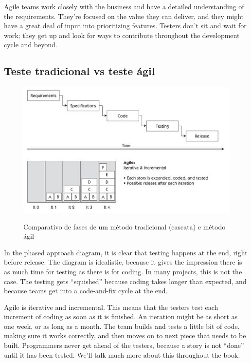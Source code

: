 \documentclass[
	12pt,				%
	openright,			%
	oneside,			%
	a4paper,			%
	english,			%
	brazil,				%
	]{abntex2}
\begin{document}
Agile teams work closely with the business and have a detailed understanding of the requirements. They’re focused on the value they can deliver, and they might have a great deal of input into prioritizing features. Testers don’t sit and wait for work; they get up and look for ways to contribute throughout the development cycle and beyond.

\subsection{Teste tradicional vs teste ágil}

\begin{figure}[H]
    \centering
    \caption{Comparativo de fases de um método tradicional (cascata) e método ágil}
    \graphicspath{ {./graphics/agile/} }
    \includegraphics[scale=1.0]{waterfall-vs-agile}
    \label{fig:waterfall-vs-agile}
\end{figure}

In the phased approach diagram, it is clear that testing happens at the end, right before release. The diagram is idealistic, because it gives the impression there is as much time for testing as there is for coding. In many projects, this is not the case. The testing gets “squished” because coding takes longer than expected, and because teams get into a code-and-fix cycle at the end.

Agile is iterative and incremental. This means that the testers test each increment of coding as soon as it is finished. An iteration might be as short as one week, or as long as a month. The team builds and tests a little bit of code, making sure it works correctly, and then moves on to next piece that needs to be built. Programmers never get ahead of the testers, because a story is not “done” until it has been tested. We’ll talk much more about this throughout the book.
\end{document}
